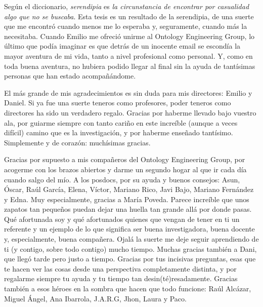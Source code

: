 

\begin{acknowledgementslong} %
%
Según el diccionario, \textit{serendipia} es \textit{la circunstancia de encontrar por casualidad algo que no se buscaba}. Esta tesis es un resultado de la serendipia, de una suerte que me encontró cuando menos me lo esperaba y, seguramente, cuando más la necesitaba. Cuando Emilio me ofreció unirme al Ontology Engineering Group, lo último que podía imaginar es que detrás de un inocente email se escondía la mayor aventura de mi vida, tanto a nivel profesional como personal. Y, como en toda buena aventura, no hubiera podido llegar al final sin la ayuda de tantísimas personas que han estado acompañándome. 

El más grande de mis agradecimientos es sin duda para mis directores: Emilio y Daniel. Si ya fue una suerte teneros como profesores, poder teneros como directores ha sido un verdadero regalo. Gracias por haberme llevado bajo vuestro ala, por guiarme siempre con tanto cariño en este increíble (aunque a veces difícil) camino que es la investigación, y por haberme enseñado tantísimo. Simplemente y de corazón: muchísimas gracias.

Gracias por supuesto a mis compañeros del Ontology Engineering Group, por acogerme con los brazos abiertos y darme un segundo hogar al que ir cada día cuando salgo del mío. A los posdocs, por su ayuda y buenos consejos: Asun, Óscar, Raúl García, Elena, Víctor, Mariano Rico, Javi Bajo, Mariano Fernández y Edna. Muy especialmente, gracias a María Poveda. Parece increíble que unos zapatos tan pequeños puedan dejar una huella tan grande allá por donde pasas. Qué afortunada soy y qué afortunados quienes que vengan de tener en ti un referente y un ejemplo de lo que significa ser buena investigadora, buena docente y, especialmente, buena compañera. Ojalá la suerte me deje seguir aprendiendo de ti (y contigo, sobre todo contigo) mucho tiempo. Muchas gracias también a Dani, que llegó tarde pero justo a tiempo. Gracias por tus incisivas preguntas, esas que te hacen ver las cosas desde una perspectiva completamente distinta, y por regalarme siempre tu ayuda y tu tiempo tan desin(té)resadamente. Gracias también a esos héroes en la sombra que hacen que todo funcione: Raúl Alcázar, Miguel Ángel, Ana Ibarrola, J.A.R.G, Jhon, Laura y Paco. 



\end{acknowledgementslong}
